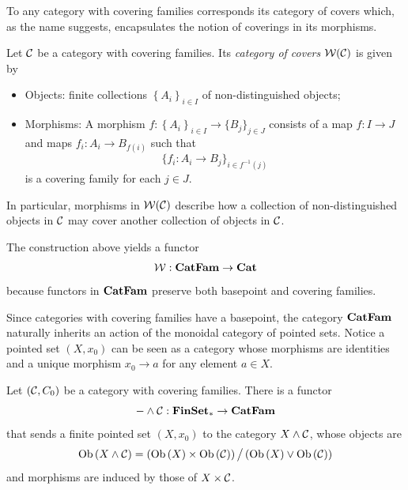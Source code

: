 To any category with covering families corresponds its category of covers which, as the name suggests, encapsulates the notion of coverings in its morphisms.

\begin{definition}
    Let $\mathcal{C}$ be a category with covering families. Its \emph{category of covers} $\mathcal{W}\lparen \mathcal{C} \rparen$ is given by
        \begin{itemize}
            \item Objects: finite collections $\left\{A_{i}\right\}_{i \in I}$ of non-distinguished objects;
            \item Morphisms: A morphism $f : \left\{A_i\right\}_{i \in I} \to \{B_j\}_{j \in J}$ consists of a map $f : I \to J$ and maps $f_i : A_i \to B_{f(i)}$ such that 
            \[ \{ f_i : A_i \to B_j \}_{i \in f^{-1}(j)} \]
            is a covering family for each $j \in J$.
        \end{itemize}
\end{definition}

In particular, morphisms in $\mathcal{W}\lparen \mathcal{C} \rparen$ describe how a collection of non-distinguished objects in $\mathcal{C}$ may cover another collection of objects in $\mathcal{C}$.

The construction above yields a functor
\[ \mathcal{W} : \textbf{CatFam} \to \textbf{Cat} \]
because functors in $\textbf{CatFam}$ preserve both basepoint and covering families.

Since categories with covering families have a basepoint, the category $\textbf{CatFam}$ naturally inherits an action of the monoidal category of pointed sets. Notice a pointed set $(X, x_0)$ can be seen as a category whose morphisms are identities and a unique morphism $x_0 \to a$ for any element $a \in X$.

\begin{propdef}
    Let $(\mathcal{C}, C_0)$ be a category with covering families. There is a functor
        \[ - \wedge \mathcal{C} : \textbf{FinSet}_* \to \textbf{CatFam} \]
    that sends a finite pointed set $(X, x_0)$ to the category $X \wedge \mathcal{C}$, whose objects are
    \[ \operatorname{Ob}{\lparen X \wedge \mathcal{C} \rparen} = \left( \operatorname{Ob}{\lparen X \rparen} \times \operatorname{Ob}{\lparen \mathcal{C} \rparen} \right) \big/ \left({\operatorname{Ob}{\lparen X \rparen} \vee \operatorname{Ob}{\lparen \mathcal{C} \rparen}} \right) \]
    and morphisms are induced by those of $X \times \mathcal{C}$.
\end{propdef}

